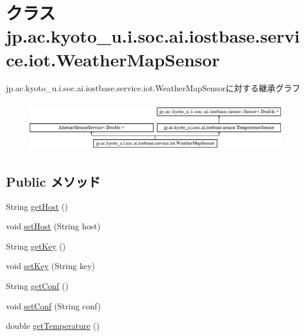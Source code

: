 \hypertarget{classjp_1_1ac_1_1kyoto__u_1_1i_1_1soc_1_1ai_1_1iostbase_1_1service_1_1iot_1_1_weather_map_sensor}{\section{クラス jp.\-ac.\-kyoto\-\_\-u.\-i.\-soc.\-ai.\-iostbase.\-service.\-iot.\-Weather\-Map\-Sensor}
\label{classjp_1_1ac_1_1kyoto__u_1_1i_1_1soc_1_1ai_1_1iostbase_1_1service_1_1iot_1_1_weather_map_sensor}
}
jp.\-ac.\-kyoto\-\_\-u.\-i.\-soc.\-ai.\-iostbase.\-service.\-iot.\-Weather\-Map\-Sensorに対する継承グラフ\begin{figure}[H]
\begin{center}
\leavevmode
\includegraphics[height=2.270270cm]{classjp_1_1ac_1_1kyoto__u_1_1i_1_1soc_1_1ai_1_1iostbase_1_1service_1_1iot_1_1_weather_map_sensor}
\end{center}
\end{figure}
\subsection*{Public メソッド}
\begin{DoxyCompactItemize}
\item 
String \hyperlink{classjp_1_1ac_1_1kyoto__u_1_1i_1_1soc_1_1ai_1_1iostbase_1_1service_1_1iot_1_1_weather_map_sensor_a3b2f265285ef16a332d6808154b31b1a}{get\-Host} ()
\item 
void \hyperlink{classjp_1_1ac_1_1kyoto__u_1_1i_1_1soc_1_1ai_1_1iostbase_1_1service_1_1iot_1_1_weather_map_sensor_af841fc2b91d50d3cb2673f6b13985218}{set\-Host} (String host)
\item 
String \hyperlink{classjp_1_1ac_1_1kyoto__u_1_1i_1_1soc_1_1ai_1_1iostbase_1_1service_1_1iot_1_1_weather_map_sensor_a7e8fed21e3bd64a438c6a129cc61ad5d}{get\-Key} ()
\item 
void \hyperlink{classjp_1_1ac_1_1kyoto__u_1_1i_1_1soc_1_1ai_1_1iostbase_1_1service_1_1iot_1_1_weather_map_sensor_aadfdba07f0258a0ffd3746eb8ccb7450}{set\-Key} (String key)
\item 
String \hyperlink{classjp_1_1ac_1_1kyoto__u_1_1i_1_1soc_1_1ai_1_1iostbase_1_1service_1_1iot_1_1_weather_map_sensor_a2f15e17345643547087029ae018c5e89}{get\-Conf} ()
\item 
void \hyperlink{classjp_1_1ac_1_1kyoto__u_1_1i_1_1soc_1_1ai_1_1iostbase_1_1service_1_1iot_1_1_weather_map_sensor_a4db26f50004870433afdb12947eff55c}{set\-Conf} (String conf)
\item 
double \hyperlink{classjp_1_1ac_1_1kyoto__u_1_1i_1_1soc_1_1ai_1_1iostbase_1_1service_1_1iot_1_1_weather_map_sensor_ac5c5f9f4b9507dff165829a748ccfa32}{get\-Temperature} ()
\end{DoxyCompactItemize}


